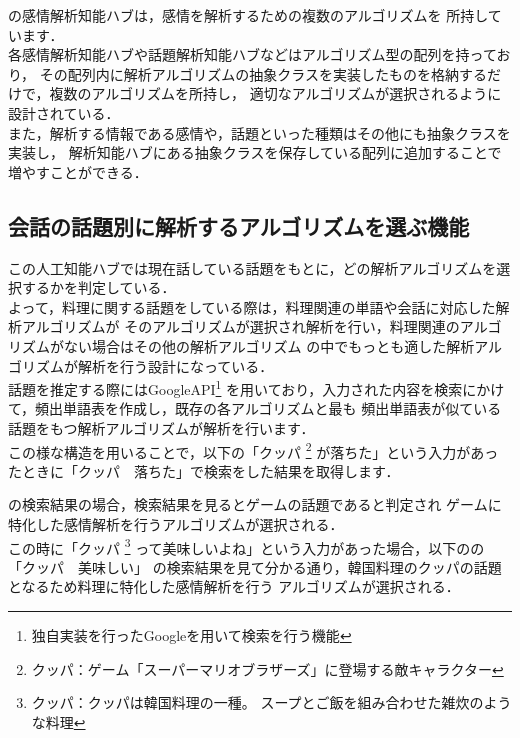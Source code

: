 
の感情解析知能ハブは，感情を解析するための複数のアルゴリズムを
所持しています．
\\
各感情解析知能ハブや話題解析知能ハブなどはアルゴリズム型の配列を持っており，
その配列内に解析アルゴリズムの抽象クラスを実装したものを格納するだけで，複数のアルゴリズムを所持し，
適切なアルゴリズムが選択されるように設計されている．
\\
また，解析する情報である感情や，話題といった種類はその他にも抽象クラスを実装し，
解析知能ハブにある抽象クラスを保存している配列に追加することで増やすことができる．
\\

\subsection{会話の話題別に解析するアルゴリズムを選ぶ機能}
この人工知能ハブでは現在話している話題をもとに，どの解析アルゴリズムを選択するかを判定している．\\
よって，料理に関する話題をしている際は，料理関連の単語や会話に対応した解析アルゴリズムが
そのアルゴリズムが選択され解析を行い，料理関連のアルゴリズムがない場合はその他の解析アルゴリズム
の中でもっとも適した解析アルゴリズムが解析を行う設計になっている．
\\
話題を推定する際にはGoogleAPI\footnote{独自実装を行ったGoogleを用いて検索を行う機能}
を用いており，入力された内容を検索にかけて，頻出単語表を作成し，既存の各アルゴリズムと最も
頻出単語表が似ている話題をもつ解析アルゴリズムが解析を行います．
\\
この様な構造を用いることで，以下の「クッパ
	\footnote{クッパ：ゲーム「スーパーマリオブラザーズ」に登場する敵キャラクター}
が落ちた」という入力があったときに「クッパ　落ちた」で検索をした結果を取得します．


の検索結果の場合，検索結果を見るとゲームの話題であると判定され
ゲームに特化した感情解析を行うアルゴリズムが選択される．\\

この時に「クッパ
	\footnote{クッパ：クッパは韓国料理の一種。 スープとご飯を組み合わせた雑炊のような料理}
って美味しいよね」という入力があった場合，以下のの「クッパ　美味しい」
の検索結果を見て分かる通り，韓国料理のクッパの話題となるため料理に特化した感情解析を行う
アルゴリズムが選択される．

